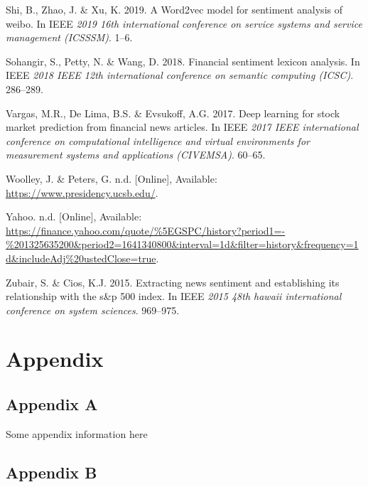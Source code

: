 \documentclass[11pt,preprint, authoryear]{elsarticle}
\numberwithin{equation}{section}
\numberwithin{figure}{section}
\numberwithin{table}{section}
\newlength{\cslhangindent}
\newenvironment{CSLReferences}%
  {\setlength{\parindent}{0pt}%
  \everypar{\setlength{\hangindent}{\cslhangindent}}\ignorespaces}%
  {\par}
\begin{document}
\begin{CSLReferences}{1}{0}
\leavevmode{}%
Shi, B., Zhao, J. \& Xu, K. 2019. A Word2vec model for sentiment
analysis of weibo. In IEEE \emph{2019 16th international conference on
service systems and service management (ICSSSM)}. 1--6.

\leavevmode{}%
Sohangir, S., Petty, N. \& Wang, D. 2018. Financial sentiment lexicon
analysis. In IEEE \emph{2018 IEEE 12th international conference on
semantic computing (ICSC)}. 286--289.

\leavevmode{}%
Vargas, M.R., De Lima, B.S. \& Evsukoff, A.G. 2017. Deep learning for
stock market prediction from financial news articles. In IEEE \emph{2017
IEEE international conference on computational intelligence and virtual
environments for measurement systems and applications (CIVEMSA)}.
60--65.

\leavevmode{}%
Woolley, J. \& Peters, G. n.d. {[}Online{]}, Available:
\url{https://www.presidency.ucsb.edu/}.

\leavevmode{}%
Yahoo. n.d. {[}Online{]}, Available:
\url{https://finance.yahoo.com/quote/\%5EGSPC/history?period1=-\%201325635200\&period2=1641340800\&interval=1d\&filter=history\&frequency=1d\&includeAdj\%20ustedClose=true}.

\leavevmode{}%
Zubair, S. \& Cios, K.J. 2015. Extracting news sentiment and
establishing its relationship with the s\&p 500 index. In IEEE
\emph{2015 48th hawaii international conference on system sciences}.
969--975.

\end{CSLReferences}

\hypertarget{appendix}{%
\section*{Appendix}\label{appendix}}

\hypertarget{appendix-a}{%
\subsection*{Appendix A}\label{appendix-a}}

Some appendix information here

\hypertarget{appendix-b}{%
\subsection*{Appendix B}\label{appendix-b}}


\end{document}
